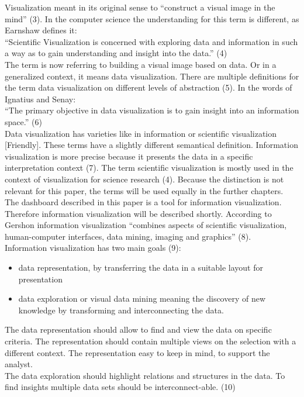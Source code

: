 \documentclass[american,a4paper,oneside,,tablecaptionabove]{scrbook}
\begin{document}
Visualization meant in its original sense to \enquote{construct a visual
image in the mind} (3). In the computer science the understanding for
this term is different, as Earnshaw defines it:\\
\enquote{Scientific Visualization is concerned with exploring data and
information in such a way as to gain understanding and insight into the
data.} (4)\\
The term is now referring to building a visual image based on data. Or
in a generalized context, it means data visualization. There are
multiple definitions for the term data visualization on different levels
of abstraction (5). In the words of Ignatius and Senay:\\
\enquote{The primary objective in data visualization is to gain insight
into an information space.} (6)\\
Data visualization has varieties like in information or scientific
visualization {[}Friendly{]}. These terms have a slightly different
semantical definition. Information visualization is more precise because
it presents the data in a specific interpretation context (7). The term
scientific visualization is mostly used in the context of visualization
for science research (4). Because the distinction is not relevant for
this paper, the terms will be used equally in the further chapters.\\
The dashboard described in this paper is a tool for information
visualization. Therefore information visualization will be described
shortly. According to Gershon information visualization
\enquote{combines aspects of scientific visualization, human-computer
interfaces, data mining, imaging and graphics} (8).\\
Information visualization has two main goals (9):

\begin{itemize}
\item
  data representation, by transferring the data in a suitable layout for
  presentation
\item
  data exploration or visual data mining meaning the discovery of new
  knowledge by transforming and interconnecting the data.
\end{itemize}

The data representation should allow to find and view the data on
specific criteria. The representation should contain multiple views on
the selection with a different context. The representation easy to keep
in mind, to support the analyst.\\
The data exploration should highlight relations and structures in the
data. To find insights multiple data sets should be interconnect-able.
(10)
\end{document}
